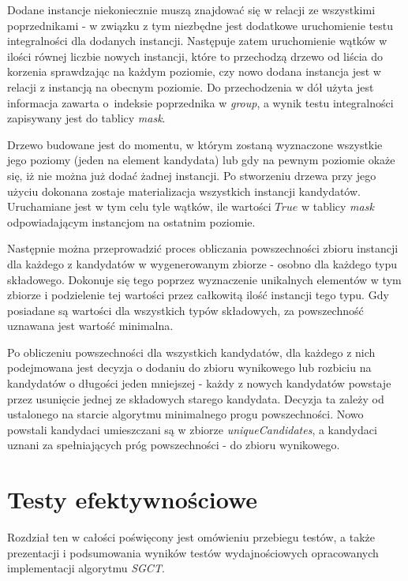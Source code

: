 \documentclass[12pt]{article}
\begin{document}
Dodane instancje niekoniecznie muszą znajdować się w relacji ze wszystkimi poprzednikami - w związku z tym niezbędne jest dodatkowe uruchomienie testu integralności dla dodanych instancji. Następuje zatem uruchomienie wątków w ilości równej liczbie nowych instancji, które to przechodzą drzewo od liścia do korzenia sprawdzając na każdym poziomie, czy nowo dodana instancja jest w relacji z instancją na obecnym poziomie. Do przechodzenia w dół użyta jest informacja zawarta o~indeksie poprzednika w \textit{group}, a wynik testu integralności zapisywany jest do tablicy \textit{mask}.

Drzewo budowane jest do momentu, w którym zostaną wyznaczone wszystkie jego poziomy (jeden na element kandydata) lub gdy na pewnym poziomie okaże się, iż nie można już dodać żadnej instancji. Po stworzeniu drzewa przy jego użyciu dokonana zostaje materializacja wszystkich instancji kandydatów. Uruchamiane jest w tym celu tyle wątków, ile wartości $ True $ w tablicy \textit{mask} odpowiadającym instancjom na ostatnim poziomie. 

Następnie można przeprowadzić proces obliczania powszechności zbioru instancji dla każdego z kandydatów w wygenerowanym zbiorze - osobno dla każdego typu składowego. Dokonuje się tego poprzez wyznaczenie unikalnych elementów w tym zbiorze i podzielenie tej wartości przez całkowitą ilość instancji tego typu. Gdy posiadane są wartości dla wszystkich typów składowych, za powszechność uznawana jest wartość minimalna.

Po obliczeniu powszechności dla wszystkich kandydatów, dla każdego z nich podejmowana jest decyzja o dodaniu do zbioru wynikowego lub rozbiciu na kandydatów o długości jeden mniejszej - każdy z nowych kandydatów powstaje przez usunięcie jednej ze składowych starego kandydata. Decyzja ta zależy od ustalonego na starcie algorytmu minimalnego progu powszechności. Nowo powstali kandydaci umieszczani są w zbiorze \textit{uniqueCandidates}, a kandydaci uznani za spełniających próg powszechności - do zbioru wynikowego.

\newpage

\section{Testy efektywnościowe}
\label{sec:tests}

Rozdział ten w całości poświęcony jest omówieniu przebiegu testów, a także prezentacji i podsumowania wyników testów wydajnościowych opracowanych implementacji algorytmu \textit{SGCT}. 
\end{document}
